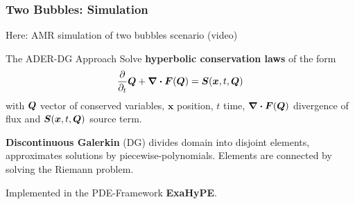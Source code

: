 \documentclass[aspectratio=169]{beamer}
\begin{document}
\begin{frame}
  \frametitle{Two Bubbles: Simulation}
  Here: AMR simulation of two bubbles scenario (video)
\end{frame}

\begin{frame}{The ADER-DG Approach}
  Solve \textbf{hyperbolic conservation laws} of the form
\begin{equation}
  \label{eq:conservation-law}
 \frac{\partial}{\partial_t}  \Q + \divergence{\flux(\Q)} = \source(\bm{x}, t, \Q)
\end{equation}
with $\bm{Q}$ vector of conserved variables, $\bm{x}$ position, $t$ time,  $\divergence{\flux(\Q)}$ divergence of flux and $\source(\bm{x}, t, \Q)$ source term.

\textbf{Discontinuous Galerkin} (\textsc{DG}) divides domain into disjoint elements, approximates solutions by piecewise-polynomials.
Elements are connected by solving the Riemann problem.


Implemented in the \textsc{PDE}-Framework \textbf{ExaHyPE}.
\end{frame}
\end{document}
